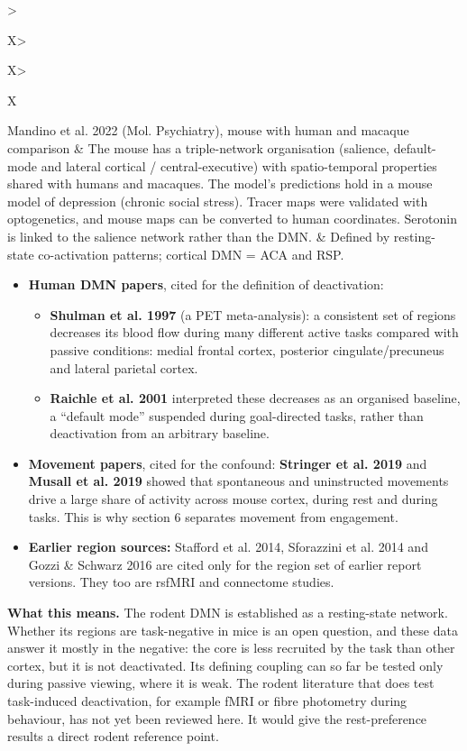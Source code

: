 \documentclass[10pt,a4paper]{article}
\begin{document}
{\begin{xltabular}{\linewidth}{>{\hsize\raggedright\arraybackslash}X>{\hsize\raggedright\arraybackslash}X>{\hsize\raggedright\arraybackslash}X}
Mandino et al. 2022 (Mol. Psychiatry), mouse with human and macaque comparison & The mouse has a triple-network organisation (salience, default-mode and lateral cortical / central-executive) with spatio-temporal properties shared with humans and macaques. The model's predictions hold in a mouse model of depression (chronic social stress). Tracer maps were validated with optogenetics, and mouse maps can be converted to human coordinates. Serotonin is linked to the salience network rather than the DMN. & Defined by resting-state co-activation patterns; cortical DMN = ACA and RSP. \\
\bottomrule
\end{xltabular}}

\begin{itemize}
\item \textbf{Human DMN papers}, cited for the definition of deactivation: 
\begin{itemize}
\item \textbf{Shulman et al. 1997} (a PET meta-analysis): a consistent set of regions decreases its blood flow during many different active tasks compared with passive conditions: medial frontal cortex, posterior cingulate/precuneus and lateral parietal cortex.
\item \textbf{Raichle et al. 2001} interpreted these decreases as an organised baseline, a ``default mode'' suspended during goal-directed tasks, rather than deactivation from an arbitrary baseline.
\end{itemize}
\item \textbf{Movement papers}, cited for the confound: \textbf{Stringer et al. 2019} and \textbf{Musall et al. 2019} showed that spontaneous and uninstructed movements drive a large share of activity across mouse cortex, during rest and during tasks. This is why section 6 separates movement from engagement.
\item \textbf{Earlier region sources:} Stafford et al. 2014, Sforazzini et al. 2014 and Gozzi \& Schwarz 2016 are cited only for the region set of earlier report versions. They too are rsfMRI and connectome studies.
\end{itemize}
\textbf{What this means.} The rodent DMN is established as a resting-state network. Whether its regions are task-negative in mice is an open question, and these data answer it mostly in the negative: the core is less recruited by the task than other cortex, but it is not deactivated. Its defining coupling can so far be tested only during passive viewing, where it is weak. The rodent literature that does test task-induced deactivation, for example fMRI or fibre photometry during behaviour, has not yet been reviewed here. It would give the rest-preference results a direct rodent reference point.
\end{document}
